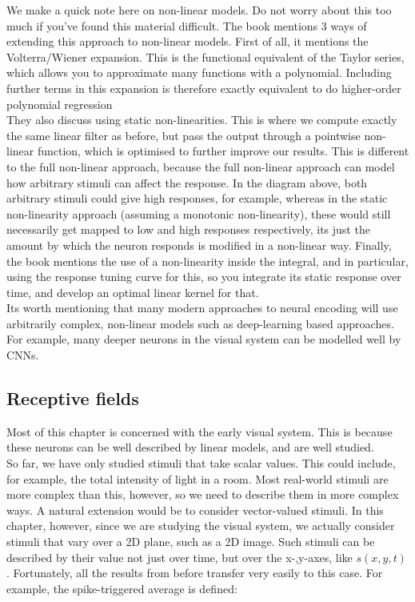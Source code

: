 \documentclass{article}
\begin{document}
We make a quick note here on non-linear models. Do not worry about this too much if you've found this material difficult. The book mentions 3 ways of extending this approach to non-linear models. First of all, it mentions the Volterra/Wiener expansion. This is the functional equivalent of the Taylor series, which allows you to approximate many functions with a polynomial. Including further terms in this expansion is therefore exactly equivalent to do higher-order polynomial regression\\

They also discuss using static non-linearities. This is where we compute exactly the same linear filter as before, but pass the output through a pointwise non-linear function, which is optimised to further improve our results. This is different to the full non-linear approach, because the full non-linear approach can model how arbitrary stimuli can affect the response. In the diagram above, both arbitrary stimuli could give high responses, for example, whereas in the static non-linearity approach (assuming a monotonic non-linearity), these would still necessarily get mapped to low and high responses respectively, its just the amount by which the neuron responds is modified in a non-linear way. Finally, the book mentions the use of a non-linearity inside the integral, and in particular, using the response tuning curve for this, so you integrate its static response over time, and develop an optimal linear kernel for that.\\

Its worth mentioning that many modern approaches to neural encoding will use arbitrarily complex, non-linear models such as deep-learning based approaches. For example, many deeper neurons in the visual system can be modelled well by CNNs.

\subsection{Receptive fields}

Most of this chapter is concerned with the early visual system. This is because these neurons can be well described by linear models, and are well studied.\\

So far, we have only studied stimuli that take scalar values. This could include, for example, the total intensity of light in a room. Most real-world stimuli are more complex than this, however, so we need to describe them in more complex ways. A natural extension would be to consider vector-valued stimuli. In this chapter, however, since we are studying the visual system, we actually consider stimuli that vary over a 2D plane, such as a 2D image. Such stimuli can be described by their value not just over time, but over the x-,y-axes, like $s(x,y,t)$. Fortunately, all the results from before transfer very easily to this case. For example, the spike-triggered average is defined:
\end{document}
